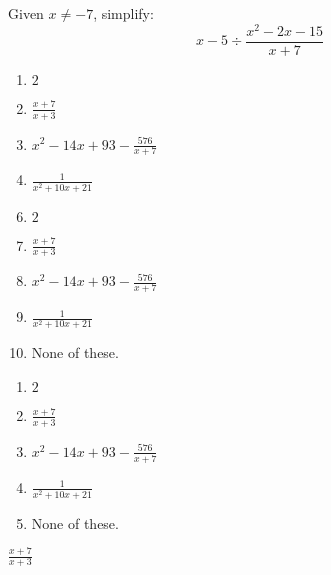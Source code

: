  
Given $x\neq-7$, simplify:
$$x-5\div\frac{x^2-2x-15}{x+7}$$


\ifsat
	\begin{enumerate}[label=\Alph*)]
		\item $2 $ 
		\item {\Large $\frac{x+7}{x+3} $ } %
		\item  $x^2-14x+93-${\Large$\frac{576}{x+7}$} 
		\item {\Large$\frac{1}{x^2+10x+21} $}
	\end{enumerate}
\else
\fi

\ifacteven
	\begin{enumerate}[label=\textbf{\Alph*.},itemsep=\fill,align=left]
		\setcounter{enumii}{5}
		\item $2 $ 
		\item {\Large $\frac{x+7}{x+3} $ } %
		\item  $x^2-14x+93-${\Large$\frac{576}{x+7}$} 
		\addtocounter{enumii}{1}
		\item {\Large$\frac{1}{x^2+10x+21} $}
		\item None of these. 
	\end{enumerate}
\else
\fi

\ifactodd
	\begin{enumerate}[label=\textbf{\Alph*.},itemsep=\fill,align=left]
		\item $2 $ 
		\item {\Large $\frac{x+7}{x+3} $ } %
		\item  $x^2-14x+93-${\Large$\frac{576}{x+7}$} 
		\item {\Large$\frac{1}{x^2+10x+21} $}
		\item None of these. 
	\end{enumerate}
\else
\fi

\ifgridin
 {\Large $\frac{x+7}{x+3} $ } %
		
\else
\fi

